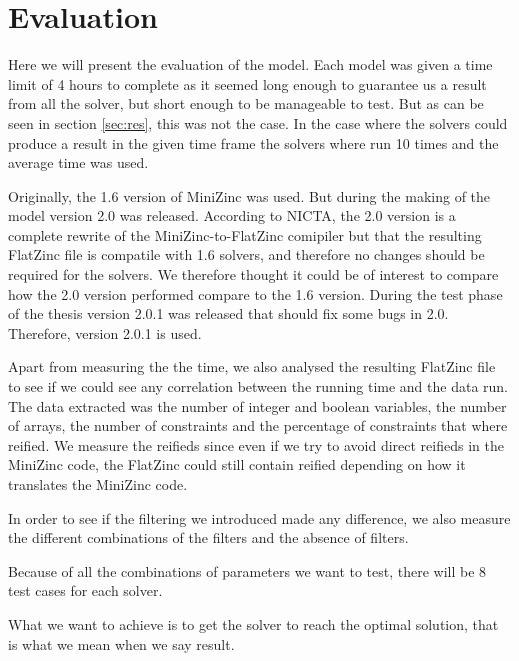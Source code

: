 \chapter{Evaluation}\label{cha:eval}
Here we will present the evaluation of the model. Each model was given a time limit of 4 hours to complete as it seemed long enough to guarantee us a result from all the solver, but short enough to be manageable to test. But as can be seen in section \ref{sec:res}, this was not the case. In the case where the solvers could produce a result in the given time frame the solvers where run 10 times and the average time was used.

Originally, the 1.6 version of MiniZinc was used. But during the making of the model version 2.0 was released. According to NICTA, the 2.0 version is a complete rewrite of the MiniZinc-to-FlatZinc comipiler but that the resulting FlatZinc file is compatile with 1.6 solvers, and therefore no changes should be required for the solvers.\cite{mz2} We therefore thought it could be of interest to compare how the 2.0 version performed compare to the 1.6 version. During the test phase of the thesis version 2.0.1 was released that should fix some bugs in 2.0.\cite{mz2_changelog} Therefore, version 2.0.1 is used.

Apart from measuring the the time, we also analysed the resulting FlatZinc file to see if we could see any correlation between the running time and the data run. The data extracted was the number of integer and boolean variables, the number of arrays, the number of constraints and the percentage of constraints that where reified. We measure the reifieds since even if we try to avoid direct reifieds in the MiniZinc code, the FlatZinc could still contain reified depending on how it translates the MiniZinc code.

In order to see if the filtering we introduced made any difference, we also measure the different combinations of the filters and the absence of filters.

Because of all the combinations of parameters we want to test, there will be 8 test cases for each solver.

What we want to achieve is to get the solver to reach the optimal solution, that is what we mean when we say result.

